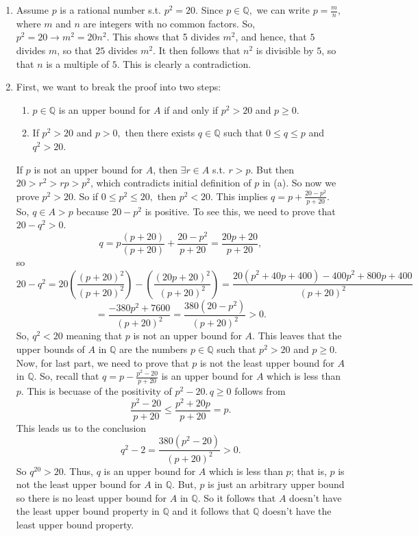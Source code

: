 \documentclass[12pt,letterpaper,boxed]{hmcpset}
\begin{document}
\begin{solution}
\vspace{-2mm}
\begin{enumerate}
	\itemsep0em
	\item Assume $p$ is a rational number s.t. $p^{2}=20.$ Since $p\in\mathbb{Q},$ we can write $p = \frac{m}{n},$ where $m$ and $n$ are integers with no common factors. So, $p^{2}=20 \rightarrow m^{2}=20n^{2}.$ This shows that 5 divides $m^2$, and hence, that $5$ divides $m$, so that $25$ divides $m^2.$ It then follows that $n^2$ is divisible by $5$, so that $n$ is a multiple of $5$. This is clearly a contradiction.
	\item First, we want to break the proof into two steps:
	\begin{enumerate}
	\itemsep0em
	\item $p\in \mathbb{Q}$ is an upper bound for $A$ if and only if $p^{2} > 20$ and $p \ge 0.$
	\item If $p^{2} > 20$ and $p > 0,$ then there exists $q \in \mathbb{Q}$ such that $0 \leq q \leq p$ and $q^{2}>20$.
	\end{enumerate}
	If $p$ is not an upper bound for $A$, then $\exists r\in A$ s.t. $r > p$. But then $20 > r^{2} > rp > p^{2}$, which contradicts initial definition of $p$ in (a). So now we prove $p^{2}>20.$ So if $0 \leq p^{2} \leq 20,$ then $p^{2}<20.$ This implies $q=p + \frac{20 - p^{2}}{p + 20}$. So, $q\in A > p$ because $20 - p^{2}$ is positive. To see this, we need to prove that $20 - q^{2} > 0$. $$ q = p\frac{(p + 20)}{(p +20)} + \frac{20 - p^{2}}{p + 20} = \frac{20p + 20}{p + 20},$$ so $$ 20 - q^{2} = 20(\frac{(p + 20)^{2}}{(p + 20)^{2}}) -  (\frac{(20p + 20)^{2}}{(p + 20)^{2}}) = \frac{20(p^{2} + 40p + 400) - 400p^{2} + 800p+400}{(p + 20)^{2}}$$ $$=\frac{-380p^{2} + 7600}{(p + 20)^{2}}= \frac{380(20 - p^{2})}{(p + 20)^{2}} > 0.$$
	So, $q^{2} < 20$ meaning that $p$ is not an upper bound for $A$. This leaves that the upper bounds of $A$ in $\mathbb{Q}$ are the numbers $p\in\mathbb{Q}$ such that $p^{2}>20$ and $p \ge 0.$ \\ Now, for last part, we need to prove that $p$ is not the least upper bound for $A$ in $\mathbb{Q}.$ So, recall that $q = p - \frac{p^{2} - 20}{p + 20}$ is an upper bound for $A$ which is less than $p$. This is becuase of the positivity of $p^{2} - 20.\, q \ge 0$ follows from $$ \frac{p^{2} - 20}{p + 20} \leq \frac{p^{2} + 20p}{p + 20}=p.$$ This leads us to the conclusion $$q^{2} - 2 = \frac{380(p^{2} - 20)}{(p + 20)^{2}} > 0.$$ So $q^{20}>20.$ Thus, $q$ is an upper bound for $A$ which is less than $p$; that is, $p$ is not the least upper bound for $A$ in $\mathbb{Q}.$ But, $p$ is just an arbitrary upper bound so there is no least upper bound for $A$ in $\mathbb{Q}$. So it follows that $A$ doesn't have the least upper bound property in $\mathbb{Q}$ and it follows that $\mathbb{Q}$ doesn't have the least upper bound property.
\end{enumerate}
\end{solution}
\end{document}
